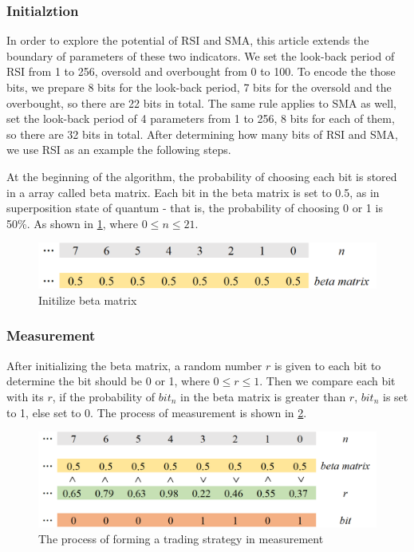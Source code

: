 \documentclass[../Proposed Method.tex]{subfiles}
\begin{document}
\subsubsection{Initialztion}

In order to explore the potential of RSI and SMA, this article extends the boundary of parameters of these two indicators. We set the look-back period of RSI from 1 to 256, oversold and overbought from 0 to 100. To encode the those bits, we prepare 8 bits for the look-back period, 7 bits for the oversold and the overbought, so there are 22 bits in total. The same rule applies to SMA as well, set the look-back period of 4 parameters from 1 to 256, 8 bits for each of them, so there are 32 bits in total. After determining how many bits of RSI and SMA, we use RSI as an example the following steps.

\bigbreak

At the beginning of the algorithm, the probability of choosing each bit is stored in a array called beta matrix. Each bit in the beta matrix is set to 0.5, as in superposition state of quantum - that is, the probability of choosing 0 or 1 is 50\%. As shown in \ref{init}, where $0 \leq n \leq 21$.

\begin{figure}[H]
    \centering
    \includegraphics[scale = 0.5] {figure/init.png}
    \caption{Initilize beta matrix}
    \label{init}
\end{figure}

\subsubsection{Measurement}

After initializing the beta matrix, a random number $r$ is given to each bit to determine the bit should be 0 or 1, where $0 \leq r \leq 1$. Then we compare each bit with its $r$, if the probability of $bit_{n}$ in the beta matrix is greater than $r$, $bit_{n}$ is set to 1, else set to 0. The process of measurement is shown in \ref{measure}.

\bigbreak

\begin{figure}[H]
    \centering
    \includegraphics[scale = 0.5] {figure/measure.png}
    \caption{The process of forming a trading strategy in measurement}
    \label{measure}
\end{figure}
\end{document}
